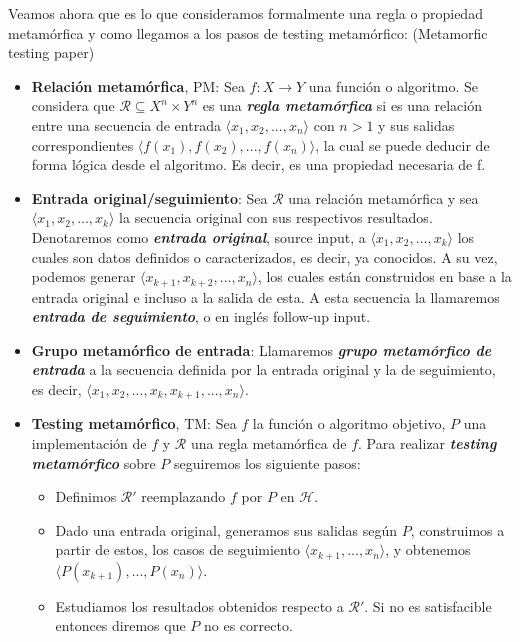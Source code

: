 Veamos ahora que es lo que consideramos formalmente una regla o propiedad metamórfica y como llegamos a los pasos de testing metamórfico: (Metamorfic testing paper)

\begin{itemize}
    \item \textbf{Relación metamórfica}, PM: Sea $f: X \rightarrow Y$ una función o algoritmo. Se considera que $\mathscr{R} \subseteq X^{n} \times Y^{n}$ es una \textbf{\textit{regla metamórfica}} si es una relación entre una secuencia de entrada $\langle x_{1},x_{2},...,x_{n}\rangle$ con $n>1$ y sus salidas correspondientes $\langle f(x_{1}),f(x_{2}),...,f(x_{n})\rangle$, la cual se puede deducir de forma lógica desde el algoritmo. Es decir, es una propiedad necesaria de f.
    \item \textbf{Entrada original/seguimiento}: Sea $\mathscr{R}$ una relación metamórfica y sea $\langle x_{1},x_{2},...,x_{k}\rangle$ la secuencia original con sus respectivos resultados. Denotaremos como \textbf{\textit{entrada original}}, source input, a   $\langle x_{1},x_{2},...,x_{k}\rangle$  los cuales son datos definidos o caracterizados, es decir, ya conocidos. A su vez, podemos generar $\langle x_{k+1},x_{k+2},...,x_{n}\rangle$, los cuales están construidos en base a la entrada original e incluso a la salida de esta. A esta secuencia la llamaremos \textbf{\textit{entrada de seguimiento}}, o en inglés follow-up input.
    \item \textbf{Grupo metamórfico de entrada}: Llamaremos \textbf{\textit{grupo metamórfico de entrada}} a la secuencia definida por la entrada original y la de seguimiento, es decir, $\langle x_{1},x_{2},...,x_{k},x_{k+1},...,x_{n}\rangle$.
    \item \textbf{Testing metamórfico}, TM: Sea $f$ la función o algoritmo objetivo, $P$ una implementación de $f$ y $\mathscr{R}$ una regla metamórfica de $f$. Para realizar \textbf{\textit{testing metamórfico}} sobre $P$ seguiremos los siguiente pasos:
    \begin{itemize}
        \item Definimos $\mathscr{R}'$ reemplazando $f$ por $P$ en $\mathscr{H}$.
        \item Dado una entrada original, generamos sus salidas según $P$, construimos a partir de estos, los casos de seguimiento $\langle x_{k+1},...,x_{n}\rangle$, y obtenemos $\langle P(x_{k+1}),...,P(x_{n})\rangle$.
        \item Estudiamos los resultados obtenidos respecto a $\mathscr{R}'$. Si no es satisfacible entonces diremos que $P$ no es correcto.
    \end{itemize}
\end{itemize}

